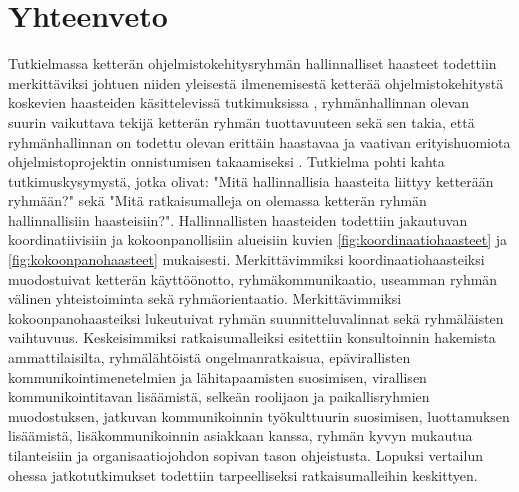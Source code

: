 \chapter{Yhteenveto\label{conclusions}}

Tutkielmassa ketterän ohjelmistokehitysryhmän hallinnalliset haasteet todettiin merkittäviksi johtuen niiden yleisestä ilmenemisestä ketterää ohjelmistokehitystä koskevien haasteiden käsittelevissä tutkimuksissa \cite{7872736}, ryhmänhallinnan olevan suurin vaikuttava tekijä ketterän ryhmän tuottavuuteen \cite{DEOMELO2013412} sekä sen takia, että ryhmänhallinnan on todettu olevan erittäin haastavaa ja vaativan erityishuomiota ohjelmistoprojektin onnistumisen takaamiseksi \cite{7872736}. Tutkielma pohti kahta tutkimuskysymystä, jotka olivat: "Mitä hallinnallisia haasteita liittyy ketterään ryhmään?" sekä "Mitä ratkaisumalleja on olemassa ketterän ryhmän hallinnallisiin haasteisiin?". Hallinnallisten haasteiden todettiin jakautuvan koordinatiivisiin ja kokoonpanollisiin alueisiin kuvien \ref{fig:koordinaatiohaasteet} ja \ref{fig:kokoonpanohaasteet} mukaisesti. Merkittävimmiksi koordinaatiohaasteiksi muodostuivat ketterän käyttöönotto, ryhmäkommunikaatio, useamman ryhmän välinen yhteistoiminta sekä ryhmäorientaatio. Merkittävimmiksi kokoonpanohaasteiksi lukeutuivat ryhmän suunnitteluvalinnat sekä ryhmäläisten vaihtuvuus. Keskeisimmiksi ratkaisumalleiksi esitettiin konsultoinnin hakemista ammattilaisilta, ryhmälähtöistä ongelmanratkaisua, epävirallisten kommunikointimenetelmien ja lähitapaamisten suosimisen, virallisen kommunikointitavan lisäämistä, selkeän roolijaon ja paikallisryhmien muodostuksen, jatkuvan kommunikoinnin työkulttuurin suosimisen, luottamuksen lisäämistä, lisäkommunikoinnin asiakkaan kanssa, ryhmän kyvyn mukautua tilanteisiin ja organisaatiojohdon sopivan tason ohjeistusta. Lopuksi vertailun ohessa jatkotutkimukset todettiin tarpeelliseksi ratkaisumalleihin keskittyen.
